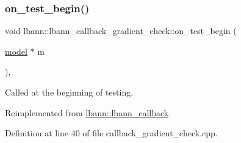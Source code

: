 \subsubsection{\texorpdfstring{on\+\_\+test\+\_\+begin()}{on\_test\_begin()}}
{\footnotesize\ttfamily void lbann\+::lbann\+\_\+callback\+\_\+gradient\+\_\+check\+::on\+\_\+test\+\_\+begin (\begin{DoxyParamCaption}\item[{\hyperlink{classlbann_1_1model}{model} $\ast$}]{m }\end{DoxyParamCaption})\hspace{0.3cm}{\ttfamily [override]}, {\ttfamily [virtual]}}

Called at the beginning of testing. 

Reimplemented from \hyperlink{classlbann_1_1lbann__callback_a716bff45bdc5a88eed09c2231f5bc93a}{lbann\+::lbann\+\_\+callback}.



Definition at line 40 of file callback\+\_\+gradient\+\_\+check.\+cpp.


